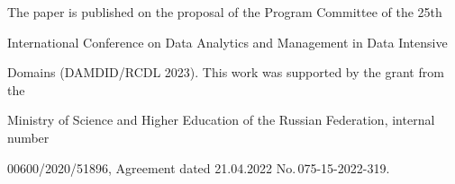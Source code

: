 















\vspace*{-10pt}








\Ack





\vspace*{-3pt}





\noindent


The paper is published on the proposal of the Program Committee of the 25th 


International Conference on Data Analytics and Management in Data Intensive 


Domains (DAMDID/RCDL 2023). This work was supported by the grant from the 


Ministry of Science and Higher Education of the Russian Federation, internal number 


00600/2020/51896, Agreement dated 21.04.2022 No.\,075-15-2022-319.













\renewcommand{\bibname}{\protect\rmfamily References}







